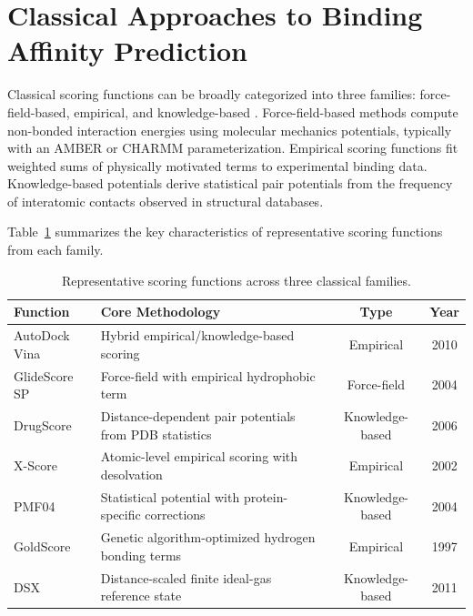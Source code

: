\section{Classical Approaches to Binding Affinity Prediction}

Classical scoring functions can be broadly categorized into three families: force-field-based, empirical, and knowledge-based \cite{Liu2018}. Force-field-based methods compute non-bonded interaction energies using molecular mechanics potentials, typically with an AMBER or CHARMM parameterization. Empirical scoring functions fit weighted sums of physically motivated terms to experimental binding data. Knowledge-based potentials derive statistical pair potentials from the frequency of interatomic contacts observed in structural databases.

Table~\ref{tab:scoring} summarizes the key characteristics of representative scoring functions from each family.

\begin{table}[htbp]
\centering
\caption{Representative scoring functions across three classical families.}\label{tab:scoring}
\singlespacing
\begin{tabularx}{\textwidth}{l>{\raggedright\arraybackslash}Xcc}
\toprule
\textbf{Function} & \textbf{Core Methodology} & \textbf{Type} & \textbf{Year} \\
\midrule
AutoDock Vina & Hybrid empirical/knowledge-based scoring & Empirical & 2010 \\
GlideScore SP & Force-field with empirical hydrophobic term & Force-field & 2004 \\
DrugScore & Distance-dependent pair potentials from PDB statistics & Knowledge-based & 2006 \\
X-Score & Atomic-level empirical scoring with desolvation & Empirical & 2002 \\
PMF04 & Statistical potential with protein-specific corrections & Knowledge-based & 2004 \\
GoldScore & Genetic algorithm-optimized hydrogen bonding terms & Empirical & 1997 \\
DSX & Distance-scaled finite ideal-gas reference state & Knowledge-based & 2011 \\
\bottomrule
\end{tabularx}
\end{table}
